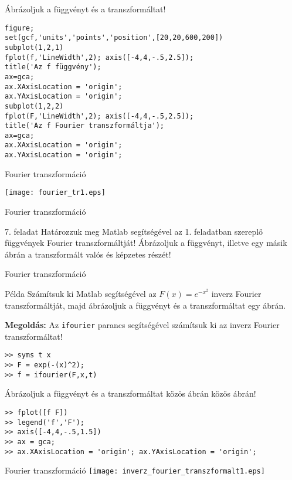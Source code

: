 \documentclass[table]{beamer}
\begin{document}
\begin{frame}[fragile]
Ábrázoljuk a függvényt és a transzformáltat!


\begin{verbatim}
figure;
set(gcf,'units','points','position',[20,20,600,200])
subplot(1,2,1)
fplot(f,'LineWidth',2); axis([-4,4,-.5,2.5]);
title('Az f függvény');
ax=gca; 
ax.XAxisLocation = 'origin';
ax.YAxisLocation = 'origin';
subplot(1,2,2)
fplot(F,'LineWidth',2); axis([-4,4,-.5,2.5]);
title('Az f Fourier transzformáltja');
ax=gca; 
ax.XAxisLocation = 'origin';
ax.YAxisLocation = 'origin';
\end{verbatim}
\end{frame}
\begin{frame}[fragile]
{Fourier transzformáció}
\begin{center}
\texttt{[image: fourier\_tr1.eps]}
\end{center}
\end{frame}
\begin{frame}[fragile]
{Fourier transzformáció}
\begin{exampleblock}{7. feladat}
Határozzuk meg Matlab segítségével az 1. feladatban szereplő függvények Fourier transzformáltját! 
Ábrázoljuk a függvényt, illetve egy m\'asik \'abr\'an a transzformált valós \'es k\'epzetes r\'esz\'et!
\end{exampleblock}
\end{frame}
\begin{frame}[fragile]
{Fourier transzformáció}
\begin{exampleblock}{Példa}
Számítsuk ki Matlab segítségével az $F(x)=e^{-x^2}$ inverz Fourier transzformáltját, majd ábrázoljuk a függvényt és a transzformáltat egy ábrán.
\end{exampleblock}
\textbf{Megoldás:}
Az \texttt{ifourier} parancs segítségével számítsuk ki az inverz Fourier transzformáltat!
\begin{verbatim}
>> syms t x
>> F = exp(-(x)^2);
>> f = ifourier(F,x,t)
\end{verbatim}
Ábrázoljuk a függvényt és a transzformáltat közös ábrán 
közös ábrán!
\begin{verbatim}
>> fplot([f F])
>> legend('f','F');
>> axis([-4,4,-.5,1.5])
>> ax = gca;
>> ax.XAxisLocation = 'origin'; ax.YAxisLocation = 'origin';
\end{verbatim}
\end{frame}
\begin{frame}[fragile]
{Fourier transzformáció}
\texttt{[image: inverz\_fourier\_transzformalt1.eps]}
\end{frame}
\end{document}
